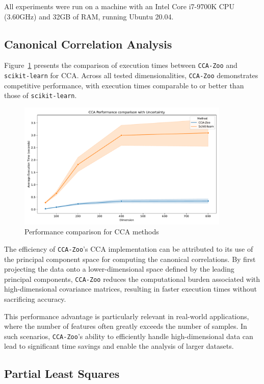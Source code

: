 All experiments were run on a machine with an Intel Core i7-9700K CPU (3.60GHz) and 32GB of RAM, running Ubuntu 20.04.

\subsection{Canonical Correlation Analysis}

Figure~\ref{fig:cca_benchmark} presents the comparison of execution times between \texttt{CCA-Zoo} and \texttt{scikit-learn} for CCA. Across all tested dimensionalities, \texttt{CCA-Zoo} demonstrates competitive performance, with execution times comparable to or better than those of \texttt{scikit-learn}.

\begin{figure}[h]
\centering
\includegraphics[width=0.9\textwidth]{figures/CCA_Speed_Benchmark}
\caption{Performance comparison for CCA methods}
\label{fig:cca_benchmark}
\end{figure}

The efficiency of \texttt{CCA-Zoo}'s CCA implementation can be attributed to its use of the principal component space for computing the canonical correlations. By first projecting the data onto a lower-dimensional space defined by the leading principal components, \texttt{CCA-Zoo} reduces the computational burden associated with high-dimensional covariance matrices, resulting in faster execution times without sacrificing accuracy.

This performance advantage is particularly relevant in real-world applications, where the number of features often greatly exceeds the number of samples. In such scenarios, \texttt{CCA-Zoo}'s ability to efficiently handle high-dimensional data can lead to significant time savings and enable the analysis of larger datasets.

\subsection{Partial Least Squares}


